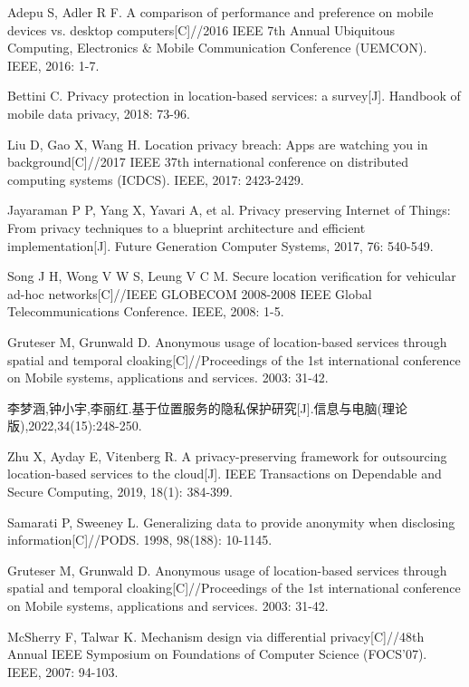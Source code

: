 \documentclass[zihao=-4]{ctexart}
\begin{document}
\newpage

\begin{thebibliography}{2}
	Adepu S, Adler R F. A comparison of performance and preference on mobile devices vs. desktop computers[C]//2016 IEEE 7th Annual Ubiquitous Computing, Electronics \& Mobile Communication Conference (UEMCON). IEEE, 2016: 1-7.
	
	Bettini C. Privacy protection in location-based services: a survey[J]. Handbook of mobile data privacy, 2018: 73-96.
	
	Liu D, Gao X, Wang H. Location privacy breach: Apps are watching you in background[C]//2017 IEEE 37th international conference on distributed computing systems (ICDCS). IEEE, 2017: 2423-2429.
	
	Jayaraman P P, Yang X, Yavari A, et al. Privacy preserving Internet of Things: From privacy techniques to a blueprint architecture and efficient implementation[J]. Future Generation Computer Systems, 2017, 76: 540-549.
	
	Song J H, Wong V W S, Leung V C M. Secure location verification for vehicular ad-hoc networks[C]//IEEE GLOBECOM 2008-2008 IEEE Global Telecommunications Conference. IEEE, 2008: 1-5.
	
	Gruteser M, Grunwald D. Anonymous usage of location-based services through spatial and temporal cloaking[C]//Proceedings of the 1st international conference on Mobile systems, applications and services. 2003: 31-42.
	
	李梦涵,钟小宇,李丽红.基于位置服务的隐私保护研究[J].信息与电脑(理论版),2022,34(15):248-250.
	
	Zhu X, Ayday E, Vitenberg R. A privacy-preserving framework for outsourcing location-based services to the cloud[J]. IEEE Transactions on Dependable and Secure Computing, 2019, 18(1): 384-399.
	
	Samarati P, Sweeney L. Generalizing data to provide anonymity when disclosing information[C]//PODS. 1998, 98(188): 10-1145.
	
	Gruteser M, Grunwald D. Anonymous usage of location-based services through spatial and temporal cloaking[C]//Proceedings of the 1st international conference on Mobile systems, applications and services. 2003: 31-42.
	
	McSherry F, Talwar K. Mechanism design via differential privacy[C]//48th Annual IEEE Symposium on Foundations of Computer Science (FOCS'07). IEEE, 2007: 94-103.
	

\end{thebibliography}
\end{document}
